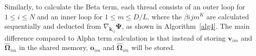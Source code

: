 

\par Similarly, to calculate the Beta term, each thread consists of an outer loop for $1\leq i\leq N$ and an inner loop for $1\leq m\leq D/L$, where the $\beta{ijm}^{K}$ are calculated sequentially and deducted from $\nabla_{\mathbf{k}_{ij}}\mathbf{\Psi}$, as shown in Algorithm~\ref{alg4}. The main difference compared to Alpha term calculation is that instead of storing $\mathbf{v}_{im}$ and $\mathbf{\hat{\Omega}}_{im}$ in the shared memory, $\mathbf{o}_{im}$ and $\mathbf{\hat{\Omega}}_{im}$ will be stored.




